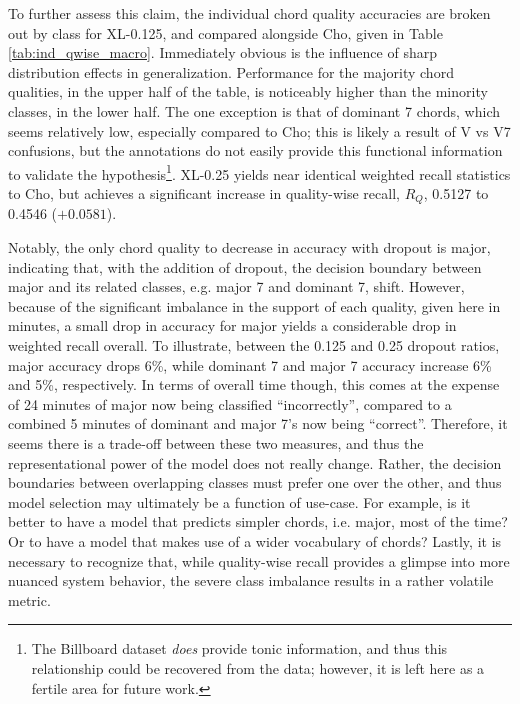 To further assess this claim, the individual chord quality accuracies are broken out by class for XL-0.125, and compared alongside Cho, given in Table \ref{tab:ind_qwise_macro}.
Immediately obvious is the influence of sharp distribution effects in generalization.
Performance for the majority chord qualities, in the upper half of the table, is noticeably higher than the minority classes, in the lower half.
The one exception is that of dominant 7 chords, which seems relatively low, especially compared to Cho;
this is likely a result of V vs V7 confusions, but the annotations do not easily provide this functional information to validate the hypothesis\footnote{The Billboard dataset \emph{does} provide tonic information, and thus this relationship could be recovered from the data; however, it is left here as a fertile area for future work.}.
XL-0.25 yields near identical weighted recall statistics to Cho, but achieves a significant increase in quality-wise recall, $R_{Q}$, 0.5127 to 0.4546 ($+0.0581$).


Notably, the only chord quality to decrease in accuracy with dropout is major, indicating that, with the addition of dropout, the decision boundary between major and its related classes, e.g. major 7 and dominant 7, shift.
However, because of the significant imbalance in the support of each quality, given here in minutes, a small drop in accuracy for major yields a considerable drop in weighted recall overall.
To illustrate, between the 0.125 and 0.25 dropout ratios, major accuracy drops 6\%, while dominant 7 and major 7 accuracy increase 6\% and 5\%, respectively.
In terms of overall time though, this comes at the expense of 24 minutes of major now being classified ``incorrectly'', compared to a combined 5 minutes of dominant and major 7's now being ``correct''.
Therefore, it seems there is a trade-off between these two measures, and thus the representational power of the model does not really change.
Rather, the decision boundaries between overlapping classes must prefer one over the other, and thus model selection may ultimately be a function of use-case.
For example, is it better to have a model that predicts simpler chords, i.e. major, most of the time? Or to have a model that makes use of a wider vocabulary of chords?
Lastly, it is necessary to recognize that, while quality-wise recall provides a glimpse into more nuanced system behavior, the severe class imbalance results in a rather volatile metric.


